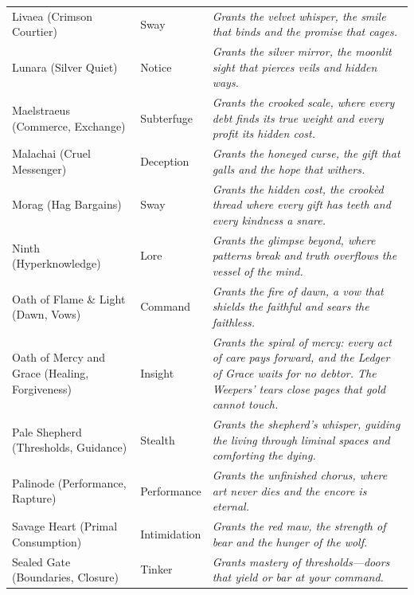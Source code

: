 \begin{longtable}{@{}p{4.2cm}p{3.2cm}p{7.2cm}@{}}
Livaea (Crimson Courtier) & Sway &
\emph{Grants the velvet whisper, the smile that binds and the promise that cages.} \\

Lunara (Silver Quiet) & Notice &
\emph{Grants the silver mirror, the moonlit sight that pierces veils and hidden ways.} \\

Maelstraeus (Commerce, Exchange) & Subterfuge &
\emph{Grants the crooked scale, where every debt finds its true weight and every profit its hidden cost.} \\

Malachai (Cruel Messenger) & Deception &
\emph{Grants the honeyed curse, the gift that galls and the hope that withers.} \\

Morag (Hag Bargains) & Sway &
\emph{Grants the hidden cost, the crookèd thread where every gift has teeth and every kindness a snare.} \\

Ninth (Hyperknowledge) & Lore &
\emph{Grants the glimpse beyond, where patterns break and truth overflows the vessel of the mind.} \\

Oath of Flame \& Light (Dawn, Vows) & Command &
\emph{Grants the fire of dawn, a vow that shields the faithful and sears the faithless.} \\

Oath of Mercy and Grace (Healing, Forgiveness) & Insight &
\emph{Grants the spiral of mercy: every act of care pays forward, and the Ledger of Grace waits for no debtor. The Weepers' tears close pages that gold cannot touch.} \\

Pale Shepherd (Thresholds, Guidance) & Stealth &
\emph{Grants the shepherd's whisper, guiding the living through liminal spaces and comforting the dying.} \\

Palinode (Performance, Rapture) & Performance &
\emph{Grants the unfinished chorus, where art never dies and the encore is eternal.} \\

Savage Heart (Primal Consumption) & Intimidation &
\emph{Grants the red maw, the strength of bear and the hunger of the wolf.} \\

Sealed Gate (Boundaries, Closure) & Tinker &
\emph{Grants mastery of thresholds---doors that yield or bar at your command.} \\


\end{longtable}
